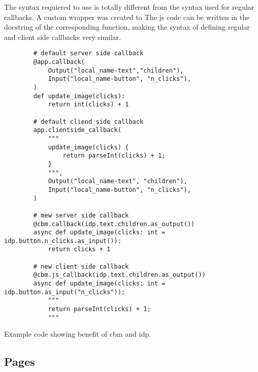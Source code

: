 The syntax requiered to use  is totally different from the syntax used for regular callbacks.
A custom wrapper was created to
The \gls{js} code can be written in the docstring of the corresponding \py function, making the syntax of defining regular and client side callbacks very similar.

\begin{listing}[H]
    \begin{verbatim}
        # default server side callback
        @app.callback(
            Output("local_name-text","children"),
            Input("local_name-button", "n_clicks"),
        )
        def update_image(clicks):
            return int(clicks) + 1

        # default cliend side callback
        app.clientside_callback(
            """
            update_image(clicks) {
                return parseInt(clicks) + 1;
            }
            """,
            Output("local_name-text", "children"),
            Input("local_name-button", "n_clicks"),
        )

        # mew server side callback
        @cbm.callback(idp.text.children.as_output())
        async def update_image(clicks: int = idp.button.n_clicks.as_input()):
            return clicks + 1

        # new client side callback
        @cbm.js_callback(idp.text.children.as_output())
        async def update_image(clicks: int = idp.button.as_input("n_clicks")):
            """
            return parseInt(clicks) + 1;
            """
    \end{verbatim}
    \caption{Example code showing benefit of \gls{cbm} and \gls{idp}.}
    \label{lst:cbm_idp_example}
\end{listing}





\subsection{Pages}
